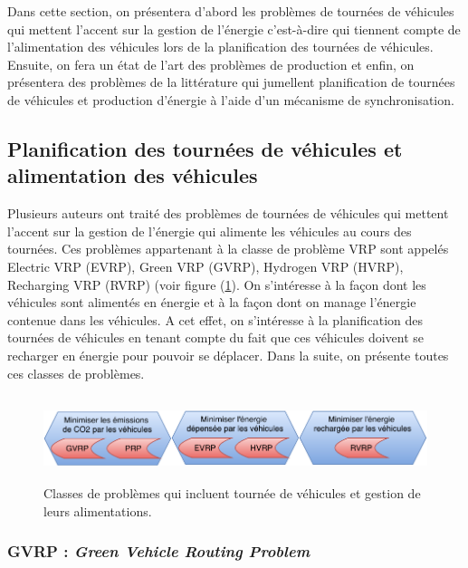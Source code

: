 Dans cette section, on présentera d'abord les problèmes de tournées de véhicules qui mettent l'accent sur la gestion de l'énergie c'est-à-dire qui tiennent compte de l'alimentation des véhicules lors de la planification des tournées de véhicules. Ensuite, on fera un état de l'art des problèmes de production et enfin, on présentera des problèmes de la littérature qui jumellent planification de tournées de véhicules et production d'énergie à l'aide d'un mécanisme de synchronisation.

\subsection{Planification des tournées de véhicules et alimentation des véhicules}
Plusieurs auteurs ont traité des problèmes de tournées de véhicules qui mettent l'accent sur la gestion de l'énergie qui alimente les véhicules au cours des tournées. Ces problèmes appartenant à la classe de problème VRP sont appelés Electric VRP (EVRP), Green VRP (GVRP), Hydrogen VRP (HVRP), Recharging VRP (RVRP) (voir figure (\ref{Etat_art_recharge}). On s'intéresse à la façon dont les véhicules sont alimentés en énergie et à la façon dont on manage l'énergie contenue dans les véhicules. A cet effet, on s'intéresse à la planification des tournées de véhicules en tenant compte du fait que ces véhicules doivent se recharger en énergie pour pouvoir se déplacer. Dans la suite, on présente toutes ces classes de problèmes.

\begin{figure}[H]
	\centerline{
		\includegraphics[height=2.5cm]{images_these/Etat_art_recharge.pdf}}
	\caption[Problèmes incluant tournée de véhicules et gestion de leurs alimentations]{Classes de problèmes qui incluent tournée de véhicules et gestion de leurs alimentations.}
	\label{Etat_art_recharge}
\end{figure}
\subsubsection{GVRP : \textit{Green Vehicle Routing Problem}}

